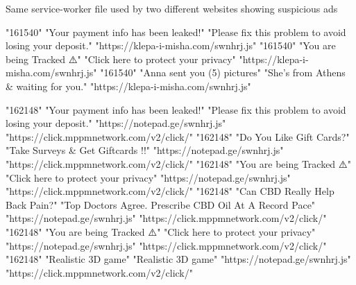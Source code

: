 Same service-worker file used by two different websites showing suspicious ads

"161540"	"Your payment info has been leaked!"	"Please fix this problem to avoid losing your deposit."	"https://klepa-i-misha.com/swnhrj.js"
"161540"	"You are being Tracked ⚠️"	"Click here to protect your privacy"	"https://klepa-i-misha.com/swnhrj.js"
"161540"	"Anna sent you (5) pictures"	"She's from Athens & waiting for you."	"https://klepa-i-misha.com/swnhrj.js"


"162148"	"Your payment info has been leaked!"	"Please fix this problem to avoid losing your deposit."	"https://notepad.ge/swnhrj.js"	"https://click.mppmnetwork.com/v2/click/"
"162148"	"Do You Like Gift Cards?"	"Take Surveys & Get Giftcards !!"	"https://notepad.ge/swnhrj.js"	"https://click.mppmnetwork.com/v2/click/"
"162148"	"You are being Tracked ⚠️"	"Click here to protect your privacy"	"https://notepad.ge/swnhrj.js"	"https://click.mppmnetwork.com/v2/click/"
"162148"	"Can CBD Really Help Back Pain?"	"Top Doctors Agree.  Prescribe CBD Oil At A Record Pace"	"https://notepad.ge/swnhrj.js"	"https://click.mppmnetwork.com/v2/click/"
"162148"	"You are being Tracked ⚠️"	"Click here to protect your privacy"	"https://notepad.ge/swnhrj.js"	"https://click.mppmnetwork.com/v2/click/"
"162148"	"Realistic 3D game"	"Realistic 3D game"	"https://notepad.ge/swnhrj.js"	"https://click.mppmnetwork.com/v2/click/"